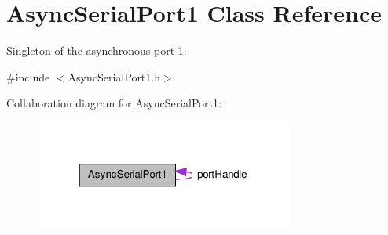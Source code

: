 \hypertarget{class_async_serial_port1}{\section{\-Async\-Serial\-Port1 \-Class \-Reference}
\label{class_async_serial_port1}
}


\-Singleton of the asynchronous port 1.  




{\ttfamily \#include $<$\-Async\-Serial\-Port1.\-h$>$}



\-Collaboration diagram for \-Async\-Serial\-Port1\-:\nopagebreak
\begin{figure}[H]
\begin{center}
\leavevmode
\includegraphics[width=241pt]{class_async_serial_port1__coll__graph}
\end{center}
\end{figure}

